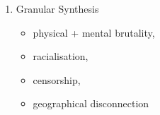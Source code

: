 \documentclass[14pt, letterpaper]{report}
\begin{document}
\begin{enumerate}
		\item   Granular Synthesis
			\begin{itemize}
				\item physical + mental brutality, 
				\item racialisation, 
				\item censorship, 
				\item geographical disconnection
			\end{itemize}
	
	\end{enumerate}

\clearpage

\nocite{*}

\printbibliography
\end{document}
